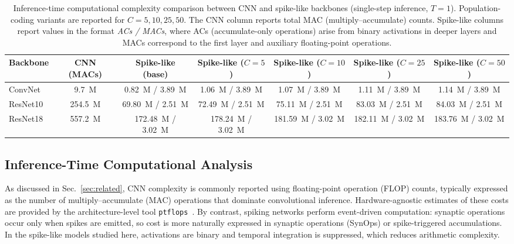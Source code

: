 \documentclass{ieeeaccess}
\begin{document}
\begin{table}[tbp]
\caption{Inference-time computational complexity comparison between CNN and spike-like backbones (single-step inference, $T = 1$). Population-coding variants are reported for $C=5,10,25,50$. The CNN column reports total MAC (multiply--accumulate) counts. Spike-like columns report values in the format \textit{ACs / MACs}, where ACs (accumulate-only operations) arise from binary activations in deeper layers and MACs correspond to the first layer and auxiliary floating-point operations.}
\begin{center}
\small
\setlength{\tabcolsep}{4pt}
\begin{tabular}{l c c c c c c}
\toprule
\textbf{Backbone} & \textbf{CNN (MACs)} & \textbf{Spike-like (base)} & \textbf{Spike-like ($C=5$)} & \textbf{Spike-like ($C=10$)} & \textbf{Spike-like ($C=25$)} & \textbf{Spike-like ($C=50$)} \\
\midrule
ConvNet  & 9.7~M    & 0.82~M / 3.89~M   & 1.06~M / 3.89~M & 1.07~M / 3.89~M & 1.11~M / 3.89~M & 1.14~M / 3.89~M \\
ResNet10 & 254.5~M  & 69.80~M / 2.51~M  & 72.49~M / 2.51~M & 75.11~M / 2.51~M & 83.03~M / 2.51~M & 84.03~M / 2.51~M \\
ResNet18 & 557.2~M  & 172.48~M / 3.02~M & 178.24~M / 3.02~M & 181.59~M / 3.02~M & 182.11~M / 3.02~M & 183.76~M / 3.02~M \\
\bottomrule
\end{tabular}
\label{tab:computation-comparison}
\end{center}
\end{table}

\subsection{Inference-Time Computational Analysis}
As discussed in Sec.~\ref{sec:related}, CNN complexity is commonly reported using floating-point operation (FLOP) counts, typically expressed as the number of multiply--accumulate (MAC) operations that dominate convolutional inference. Hardware-agnostic estimates of these costs are provided by the architecture-level tool \texttt{ptflops}~\cite{ptflops}. By contrast, spiking networks perform event-driven computation: synaptic operations occur only when spikes are emitted, so cost is more naturally expressed in synaptic operations (SynOps) or spike-triggered accumulations. In the spike-like models studied here, activations are binary and temporal integration is suppressed, which reduces arithmetic complexity.
\end{document}
